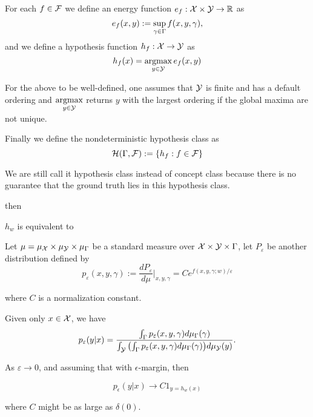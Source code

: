 \documentclass[11pt, oneside]{article}   	%
\theoremstyle{definition}
\newcommand{\pars}[1]{{\left ( {#1} \right )}}
\begin{document}
For each $f\in \mathcal{F}$ we define an energy function $e_f: \mathcal{X}\times\mathcal{Y}\to \mathbb{R}$ as
\begin{equation}
	e_f(x,y):=\sup\limits_{\gamma\in \Gamma} f(x, y, \gamma),
\end{equation}
and we define a hypothesis function $h_f: \mathcal{X}\to\mathcal{Y}$ as
\begin{equation}
	h_f(x)=\mathop{\operatorname{argmax}}\limits_{y\in \mathcal{Y}}e_f(x,y)
\end{equation}

For the above to be well-defined, one assumes that $\mathcal{Y}$ is finite and has a default ordering and $\mathop{\operatorname{argmax}}\limits_{y\in \mathcal{Y}}$ returns $y$ with the largest ordering if the global maxima are not unique.

Finally we define the nondeterministic hypothesis class as
\begin{equation}
	\mathcal{H}(\Gamma,\mathcal{F}):=\{h_f:f\in \mathcal{F}\}
\end{equation}

\begin{rmk}
	We are still call it hypothesis class instead of concept class because there is no guarantee that the ground truth lies in this hypothesis class.
\end{rmk}

then

\begin{rmk}
	 $h_w$ is equivalent to

	Let $\mu=\mu_{\mathcal{X}}\times\mu_{\mathcal{Y}}\times \mu_\Gamma$ be a standard measure over $\mathcal{X}\times\mathcal{Y}\times\Gamma$, let $P_\varepsilon$ be another distribution defined by
	$$p_\varepsilon(x,y,\gamma):=\frac{dP_\varepsilon}{d \mu}\Big|_{x,y,\gamma}=Ce^{f(x,y,\gamma;w)/ \varepsilon}$$

	where $C$ is a normalization constant.

	Given only $x\in\mathcal{X}$, we have
	\begin{equation}
		p_\varepsilon(y|x)=\frac{
			\int_{\Configuration} p_\varepsilon(x,y,\gamma)d \mu_{\Configuration}(\gamma)
		}{
			\int_{\Output}\pars{\int_{\Configuration} p_\varepsilon(x,y,\gamma)d \mu_{\Configuration}(\gamma)} d \mu_{\Output}(y)
		}.
	\end{equation}

	As $\varepsilon \to 0$, and assuming that with $\epsilon$-margin, then

	\begin{equation}
		p_\epsilon(y|x) \to C 1_{y=h_w(x)}
	\end{equation}

	where $C$ might be as large as $\delta(0)$.
\end{rmk}
\end{document}
